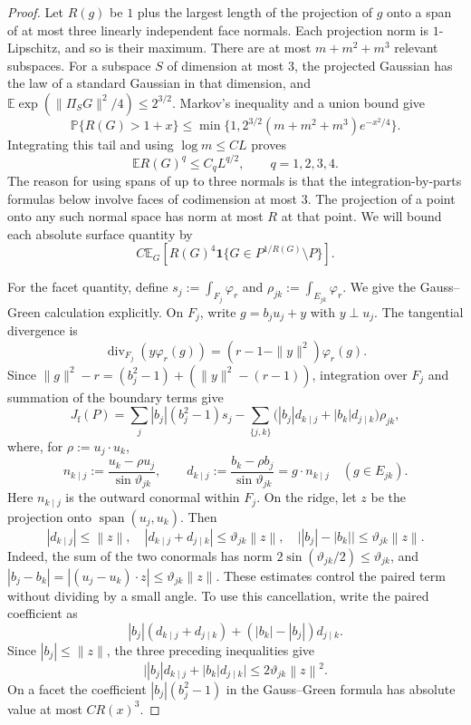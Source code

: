 \documentclass[11pt,letterpaper]{article}
\theoremstyle{remark}
\newcommand{\E}{\mathbb E}
\newcommand{\Pp}{\mathbb P}
\newcommand{\norm}[1]{\left\lVert#1\right\rVert}
\newcommand{\ind}{\mathbf 1}
\begin{document}
\begin{proof}
Let $R(g)$ be $1$ plus the largest length of the projection of $g$
onto a span of at most three linearly independent face normals.
Each projection norm is $1$-Lipschitz, and so is their maximum.
There are at most $m+m^2+m^3$ relevant subspaces. For a subspace $S$
of dimension at most $3$, the projected Gaussian has the law of a
standard Gaussian in that dimension, and
$\E\exp(\|\Pi_SG\|^2/4)\le2^{3/2}$.
Markov's inequality and a union bound give
\[
 \Pp\{R(G)>1+x\}\le
       \min\{1,2^{3/2}(m+m^2+m^3)e^{-x^2/4}\}.
\]
Integrating this tail and using $\log m\le CL$ proves
\begin{equation}
 \E R(G)^q\le C_qL^{q/2},\qquad q=1,2,3,4.
 \label{hgap:eq:R-moments}
\end{equation}
The reason for using spans of up to three normals is that the
integration-by-parts formulas below involve faces of codimension at
most $3$. The projection of a point onto any such normal space has
norm at most $R$ at that point. We will bound each absolute surface
quantity by
\begin{equation}
 C\E_G\left[R(G)^4
       \ind\{G\in P^{1/R(G)}\setminus P\}\right].
 \label{hgap:eq:localized}
\end{equation}

For the facet quantity, define $s_j:=\int_{F_j}\varphi_r$ and
$\rho_{jk}:=\int_{E_{jk}}\varphi_r$.
We give the Gauss--Green calculation explicitly. On $F_j$, write
$g=b_ju_j+y$ with $y\perp u_j$. The tangential divergence is
\[
 \operatorname{div}_{F_j}(y\varphi_r(g))
       =(r-1-\|y\|^2)\varphi_r(g).
\]
Since $\|g\|^2-r=(b_j^2-1)+(\|y\|^2-(r-1))$, integration over
$F_j$ and summation of the boundary terms give
\[
 J_{\mathrm f}(P)
 =\sum_j |b_j|(b_j^2-1)s_j
 -\sum_{\{j,k\}}
   \bigl(|b_j|d_{k\mid j}+|b_k|d_{j\mid k}\bigr)\rho_{jk},
\]
where, for $\rho:=u_j\cdot u_k$,
\[
 n_{k\mid j}:=\frac{u_k-\rho u_j}{\sin\vartheta_{jk}},\qquad
 d_{k\mid j}:=\frac{b_k-\rho b_j}{\sin\vartheta_{jk}}
             =g\cdot n_{k\mid j}\quad(g\in E_{jk}).
\]
Here $n_{k\mid j}$ is the outward conormal within $F_j$.
On the ridge, let $z$ be the projection onto
$\operatorname{span}(u_j,u_k)$. Then
\[
 |d_{k\mid j}|\le\norm z,\quad
 |d_{k\mid j}+d_{j\mid k}|\le\vartheta_{jk}\norm z,\quad
 \bigl||b_j|-|b_k|\bigr|\le\vartheta_{jk}\norm z.
\]
Indeed, the sum of the two conormals has norm
$2\sin(\vartheta_{jk}/2)\le\vartheta_{jk}$, and
$|b_j-b_k|=|(u_j-u_k)\cdot z|\le\vartheta_{jk}\|z\|$.
These estimates control the paired term without dividing by a small
angle.
To use this cancellation, write the paired coefficient as
\[
 |b_j|(d_{k\mid j}+d_{j\mid k})
                  +( |b_k|-|b_j| )d_{j\mid k}.
\]
Since $|b_j|\le\|z\|$, the three preceding inequalities give
\begin{equation}
 \bigl||b_j|d_{k\mid j}+|b_k|d_{j\mid k}\bigr|
 \le 2\vartheta_{jk}\norm z^2.
 \label{hgap:eq:weighted-pair}
\end{equation}
On a facet the coefficient $|b_j|(b_j^2-1)$ in the
Gauss--Green formula has absolute value at most $CR(x)^3$.


\end{proof}
\end{document}
